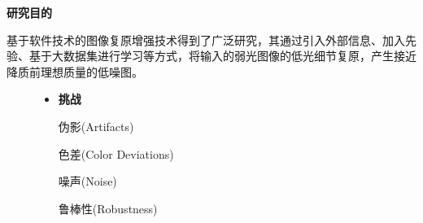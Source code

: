\documentclass[CJK,aspectratio=169]{beamer}  %
\begin{document}
	\begin{frame}
		{ \yahei \textbf{研究目的}}
		
		\vspace{0.1cm}
		
		{ \yahei 基于软件技术的图像复原增强技术得到了广泛研究，其通过引入外部信息、加入先验、基于大数据集进行学习等方式，将输入的弱光图像的低光细节复原，产生接近降质前理想质量的低噪图。}
		
		\begin{figure}
			\centering			
			\begin{minipage}{.3\columnwidth}
				\begin{itemize} 
					\item {} \yahei \textbf{挑战}
					
					 \yahei 伪影(Artifacts)
					
					 \yahei 色差(Color Deviations) 
					
					 \yahei 噪声(Noise)
					
					 \yahei 鲁棒性(Robustness)
					

\end{itemize}
\end{minipage}
\end{figure}
\end{frame}
\end{document}
